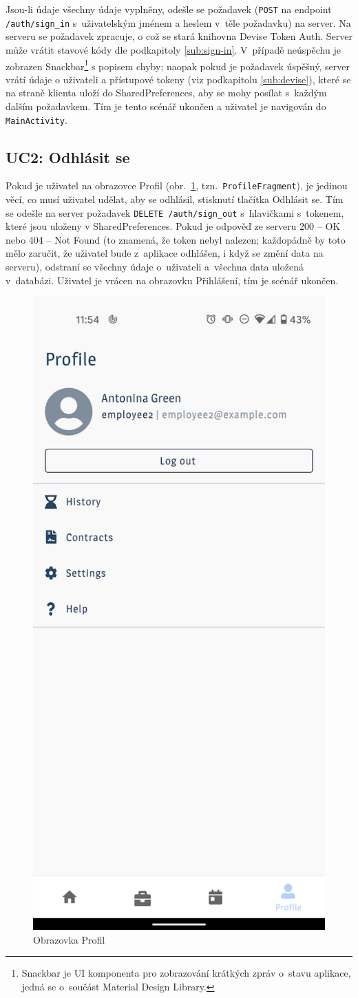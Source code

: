 \documentclass[twoside]{ctuthesis}
\begin{document}
Jsou-li údaje všechny údaje vyplněny, odešle se požadavek (\texttt{POST} na endpoint \texttt{/auth/sign\_in} s~u\-ži\-va\-tel\-ským jménem a heslem v~těle požadavku) na server. Na serveru se požadavek zpracuje, o což se stará knihovna Devise Token Auth. Server může vrátit stavové kódy dle podkapitoly \ref{sub:sign-in}. V~případě neúspěchu je zobrazen Snackbar\footnote{Snackbar je UI komponenta pro zobrazování krátkých zpráv o~stavu aplikace, jedná se o~součást Material Design Library.} s popisem chyby; naopak pokud je požadavek úspěšný, server vrátí údaje o uživateli a přístupové tokeny (viz podkapitolu \ref{sub:devise}), které se na straně klienta uloží do SharedPreferences, aby se mohy posílat s~každým dalším požadavkem. Tím je tento scénář ukončen a uživatel je navigován do \texttt{MainActivity}.



\subsection{UC2: Odhlásit se}

Pokud je uživatel na obrazovce Profil (obr.~\ref{fig:uc2-profile}, tzn.~\texttt{ProfileFragment}), je jedinou věcí, co musí uživatel udělat, aby se odhlásil, stisknutí tlačítka Odhlásit se. Tím se odešle na server požadavek \texttt{DELETE /auth/sign\_out} s~hlavičkami s~tokenem, které jsou uloženy v SharedPreferences. Pokud je odpověď ze serveru 200 -- OK nebo 404 -- Not Found (to znamená, že token nebyl nalezen; každopádně by toto mělo zaručit, že uživatel bude z~aplikace odhlášen, i když se změní data na serveru), odstraní se všechny údaje o~uživateli a~všechna data uložená v~databázi. Uživatel je vrácen na obrazovku Přihlášení, tím je scénář ukončen.

\begin{figure}[ht]
	\includegraphics[width=.45\linewidth]{img/uc2-profile.png}
	\caption{Obrazovka Profil}
	\label{fig:uc2-profile}
\end{figure}
\end{document}

